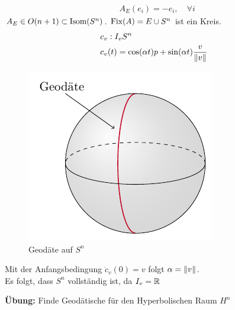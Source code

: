 \begin{bsp}
\begin{align*}
& A_E(e_i) = - e_i, \quad \forall i
\end{align*}
$A_E \in O(n+1)  \subset \operatorname{Isom} (S^n)$.
$\operatorname{Fix} (A) = E \cup S^n$ ist ein Kreis.
\begin{align}
&c_v : I_v S^n\\
&c_v(t) = \cos (\alpha t) p + \sin (\alpha t) \frac{v}{\norm{v}}
\end{align}
\begin{figure}[H]
\centering
\includegraphics[width=0.4\linewidth]{figures/tikz/geodesic_sphere.pdf}
\caption{Geodäte auf $S^n$}
\label{img:sphere_tangent_space}
\end{figure} 	
Mit der Anfangsbedingung $\dot{c}_v (0) = v$ folgt $\alpha = \norm{v}$.\\
Es folgt, dass $S^n$ vollständig ist, da $I_v = \mathbb{R}$
\end{bsp}
\textbf{Übung:} Finde Geodätische für den Hyperbolischen Raum $H^n$
